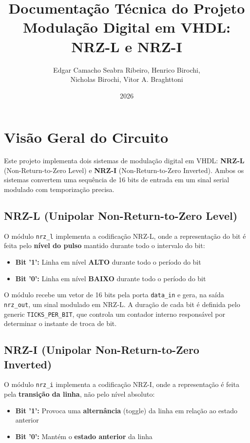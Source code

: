 \documentclass[11pt,a4paper]{article}
\title{\textbf{Documentação Técnica do Projeto}\\[0.5cm]\large{Modulação Digital em VHDL: NRZ-L e NRZ-I}}
\author{Edgar Camacho Seabra Ribeiro, Henrico Birochi,\\Nicholas Birochi, Vitor A. Braghttoni}
\date{2026}
\begin{document}
\maketitle

\tableofcontents
\newpage

\section{Visão Geral do Circuito}

Este projeto implementa dois sistemas de modulação digital em VHDL: \textbf{NRZ-L} (Non-Return-to-Zero Level) e \textbf{NRZ-I} (Non-Return-to-Zero Inverted). Ambos os sistemas convertem uma sequência de 16 bits de entrada em um sinal serial modulado com temporização precisa.

\subsection{NRZ-L (Unipolar Non-Return-to-Zero Level)}

O módulo \texttt{nrz\_l} implementa a codificação NRZ-L, onde a representação do bit é feita pelo \textbf{nível do pulso} mantido durante todo o intervalo do bit:

\begin{itemize}
    \item \textbf{Bit '1':} Linha em nível \textbf{ALTO} durante todo o período do bit
    \item \textbf{Bit '0':} Linha em nível \textbf{BAIXO} durante todo o período do bit
\end{itemize}

O módulo recebe um vetor de 16 bits pela porta \texttt{data\_in} e gera, na saída \texttt{nrz\_out}, um sinal modulado em NRZ-L. A duração de cada bit é definida pelo generic \texttt{TICKS\_PER\_BIT}, que controla um contador interno responsável por determinar o instante de troca de bit.

\subsection{NRZ-I (Unipolar Non-Return-to-Zero Inverted)}

O módulo \texttt{nrz\_i} implementa a codificação NRZ-I, onde a representação é feita pela \textbf{transição da linha}, não pelo nível absoluto:

\begin{itemize}
    \item \textbf{Bit '1':} Provoca uma \textbf{alternância} (toggle) da linha em relação ao estado anterior
    \item \textbf{Bit '0':} Mantém o \textbf{estado anterior} da linha
\end{itemize}
\end{document}
